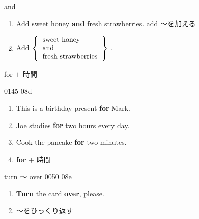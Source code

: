 \documentclass[aspectratio=169,xcolor={dvipsnames,table}]{beamer}
\begin{document}
\begin{frame}[plain]{and}
  \hypertarget{AND2}{}

  \begin{enumerate}[<+->]
    \item Add sweet honey \textbf{and} fresh strawberries.%
          \hfill{\footnotesize add  ～を加える}
    \item Add $\left\{ \begin{tabular}{l}
              sweet honey        \\
              and                \\
              fresh strawberries \\
            \end{tabular}\right\}$ .
  \end{enumerate}

  \hfill\hyperlink{READING}{}
\end{frame}
\begin{frame}[plain]{for $+$ 時間}
  \hypertarget{FOR}{}

  \hfill{\tiny 0145}\,{\scriptsize {}}\,{\tiny 08d}

  \begin{enumerate}[<+->]
    \item This is a birthday present \textbf{for} Mark.
    \item Joe studies \textbf{for} two hours every day.
    \item Cook the pancake \textbf{for} two minutes.
    \item  \textbf{for} $+$ 時間
  \end{enumerate}

  \hfill\hyperlink{READING}{}
\end{frame}
\begin{frame}[plain]{turn ～ over}
  \hypertarget{TURNOVER}{}
  \hfill{\tiny 0050}\,{\scriptsize {}}\,{\tiny 08e}

  \begin{enumerate}
    \item \textbf{Turn} the card \textbf{over}, please.
    \item ～をひっくり返す
  \end{enumerate}

  \hfill\hyperlink{READING}{}
\end{frame}
\end{document}
